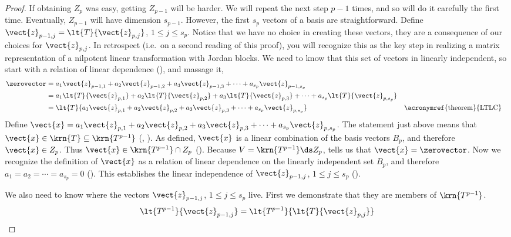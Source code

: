 \begin{proof}
%
If obtaining $Z_p$ was easy, getting $Z_{p-1}$ will be harder.  We will repeat the next step $p-1$ times, and so will do it carefully the first time.  Eventually, $Z_{p-1}$ will have dimension $s_{p-1}$.  However, the first $s_p$ vectors of a basis are straightforward.  Define $\vect{z}_{p-1,j}=\lt{T}{\vect{z}_{p,j}}$, $1\leq j\leq s_p$.  Notice that we have no choice in creating these vectors, they are a consequence of our choices for $\vect{z}_{p,j}$.  In retrospect (i.e.\ on a second reading of this proof), you will recognize  this as the key step in realizing a matrix representation of a nilpotent linear transformation with Jordan blocks.  We need to know that this set of vectors in linearly independent, so start with a relation of linear dependence (), and massage it,
%
\begin{align*}
\zerovector
&=
a_1\vect{z}_{p-1,1}+
a_2\vect{z}_{p-1,2}+
a_3\vect{z}_{p-1,3}+
\cdots+
a_{s_p}\vect{z}_{p-1,s_p}\\
%
&=
a_1\lt{T}{\vect{z}_{p,1}}+
a_2\lt{T}{\vect{z}_{p,2}}+
a_3\lt{T}{\vect{z}_{p,3}}+
\cdots+
a_{s_p}\lt{T}{\vect{z}_{p,s_p}}\\
%
&=\lt{T}{
a_1\vect{z}_{p,1}+
a_2\vect{z}_{p,2}+
a_3\vect{z}_{p,3}+
\cdots+
a_{s_p}\vect{z}_{p,s_p}
}
&&\text{\acronymref{theorem}{LTLC}}\\
\end{align*}
%
Define
$\vect{x}=
a_1\vect{z}_{p,1}+a_2\vect{z}_{p,2}+a_3\vect{z}_{p,3}+\cdots+a_{s_p}\vect{z}_{p,s_p}$.
The statement just above means that $\vect{x}\in\krn{T}\subseteq\krn{T^{p-1}}$  (, ).  As defined, $\vect{x}$ is a linear combination of the basis vectors $B_p$, and therefore $\vect{x}\in Z_p$.  Thus $\vect{x}\in\krn{T^{p-1}}\cap Z_p$ ().  Because $V=\krn{T^{p-1}}\ds Z_p$,  tells us that $\vect{x}=\zerovector$.  Now we recognize the definition of $\vect{x}$ as a relation of linear dependence on the linearly independent set $B_p$, and therefore $a_1=a_2=\cdots=a_{s_p}=0$ (). This establishes the linear independence of $\vect{z}_{p-1,j}$, $1\leq j\leq s_p$ ().\par
%
We also need to know where the vectors $\vect{z}_{p-1,j}$, $1\leq j\leq s_p$ live.  First we demonstrate that they are members of $\krn{T^{p-1}}$.
%
\begin{align*}
\lt{T^{p-1}}{\vect{z}_{p-1,j}}
&=\lt{T^{p-1}}{\lt{T}{\vect{z}_{p,j}}}\\

\end{align*}
\end{proof}
